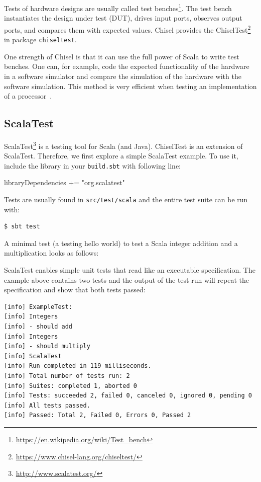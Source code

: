 \documentclass[%
    10pt,
    headinclude, footexclude,
    openright, %
    notitlepage,
    cleardoubleempty,
    headsepline,
    pointlessnumbers,
    bibtotoc, idxtotoc,
    ]{scrbook}
\newcommand{\code}[1]{{\lstinline[basicstyle=\small\ttfamily]{#1}}}
\newcommand{\myref}[2]{\href{#1}{#2}}
\renewcommand{\myref}[2]{{#2}{\footnote{\url{#1}}}}
\begin{document}
Tests of hardware designs are usually called \myref{https://en.wikipedia.org/wiki/Test_bench}{test benches}.
The test bench instantiates the design under test (DUT), drives input ports, observes output ports,
and compares them with expected values.
Chisel provides the \myref{https://www.chisel-lang.org/chiseltest/}{ChiselTest}
in package \code{chiseltest}.

One strength of Chisel is that it can use the full power of Scala to write
test benches. One can, for example, code the expected functionality of the hardware
in a software simulator and compare the simulation of the hardware with the
software simulation. This method is very efficient when testing an implementation
of a processor~\cite{lipsi:arcs2018}.

\subsection{ScalaTest}

\myref{http://www.scalatest.org/}{ScalaTest} is a testing tool for Scala (and Java). ChiselTest is an extension
of ScalaTest. Therefore, we first explore a simple ScalaTest example. To use it, include the library
in your \code{build.sbt} with following line:

\begin{chisel}
libraryDependencies += "org.scalatest" %
\end{chisel}

\noindent Tests are usually found in \code{src/test/scala} and the entire test suite can be run with:

\begin{verbatim}
$ sbt test
\end{verbatim}

\noindent A minimal test (a testing hello world) to test a Scala integer
addition and a multiplication looks as follows:


ScalaTest enables simple unit tests that read like an executable specification.
The example above contains two tests and the output of the test run will repeat the specification
and show that both tests passed:

\begin{verbatim}
[info] ExampleTest:
[info] Integers
[info] - should add
[info] Integers
[info] - should multiply
[info] ScalaTest
[info] Run completed in 119 milliseconds.
[info] Total number of tests run: 2
[info] Suites: completed 1, aborted 0
[info] Tests: succeeded 2, failed 0, canceled 0, ignored 0, pending 0
[info] All tests passed.
[info] Passed: Total 2, Failed 0, Errors 0, Passed 2
\end{verbatim}
\end{document}
